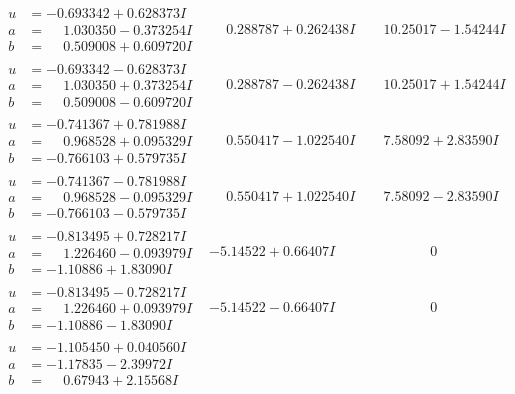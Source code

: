 \documentclass[1p]{elsarticle_modified}
\theoremstyle{definition}
\begin{document}
$$\begin{array}{c|c|c}
\begin{aligned}
u &= -0.693342 + 0.628373 I \\
a &= \phantom{-}1.030350 - 0.373254 I \\
b &= \phantom{-}0.509008 + 0.609720 I\end{aligned}
 & \phantom{-}0.288787 + 0.262438 I & \phantom{-}10.25017 - 1.54244 I \\ \hline\begin{aligned}
u &= -0.693342 - 0.628373 I \\
a &= \phantom{-}1.030350 + 0.373254 I \\
b &= \phantom{-}0.509008 - 0.609720 I\end{aligned}
 & \phantom{-}0.288787 - 0.262438 I & \phantom{-}10.25017 + 1.54244 I \\ \hline\begin{aligned}
u &= -0.741367 + 0.781988 I \\
a &= \phantom{-}0.968528 + 0.095329 I \\
b &= -0.766103 + 0.579735 I\end{aligned}
 & \phantom{-}0.550417 - 1.022540 I & \phantom{-}7.58092 + 2.83590 I \\ \hline\begin{aligned}
u &= -0.741367 - 0.781988 I \\
a &= \phantom{-}0.968528 - 0.095329 I \\
b &= -0.766103 - 0.579735 I\end{aligned}
 & \phantom{-}0.550417 + 1.022540 I & \phantom{-}7.58092 - 2.83590 I \\ \hline\begin{aligned}
u &= -0.813495 + 0.728217 I \\
a &= \phantom{-}1.226460 - 0.093979 I \\
b &= -1.10886 + 1.83090 I\end{aligned}
 & -5.14522 + 0.66407 I & \phantom{-0.000000 } 0 \\ \hline\begin{aligned}
u &= -0.813495 - 0.728217 I \\
a &= \phantom{-}1.226460 + 0.093979 I \\
b &= -1.10886 - 1.83090 I\end{aligned}
 & -5.14522 - 0.66407 I & \phantom{-0.000000 } 0 \\ \hline\begin{aligned}
u &= -1.105450 + 0.040560 I \\
a &= -1.17835 - 2.39972 I \\
b &= \phantom{-}0.67943 + 2.15568 I\end{aligned}

\end{array}$$
\end{document}
